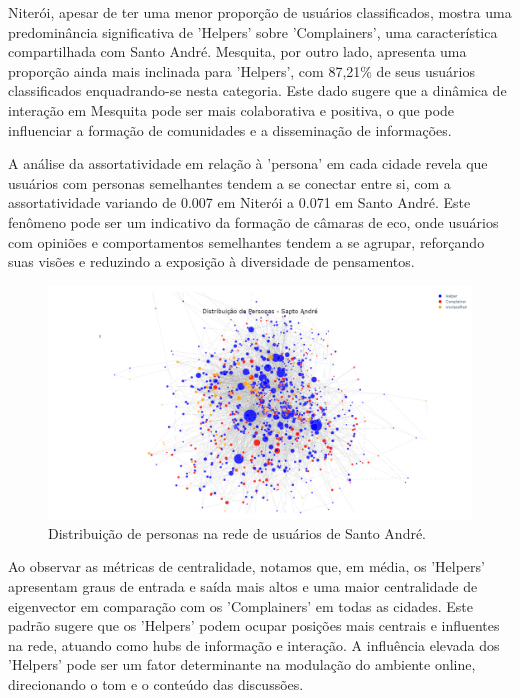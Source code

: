 Niterói, apesar de ter uma menor proporção de usuários classificados, mostra uma predominância significativa de 'Helpers' sobre 'Complainers', uma característica compartilhada com Santo André. Mesquita, por outro lado, apresenta uma proporção ainda mais inclinada para 'Helpers', com 87,21\% de seus usuários classificados enquadrando-se nesta categoria. Este dado sugere que a dinâmica de interação em Mesquita pode ser mais colaborativa e positiva, o que pode influenciar a formação de comunidades e a disseminação de informações.

A análise da assortatividade em relação à 'persona' em cada cidade revela que usuários com personas semelhantes tendem a se conectar entre si, com a assortatividade variando de 0.007 em Niterói a 0.071 em Santo André. Este fenômeno pode ser um indicativo da formação de câmaras de eco, onde usuários com opiniões e comportamentos semelhantes tendem a se agrupar, reforçando suas visões e reduzindo a exposição à diversidade de pensamentos.

\begin{figure}[h]
    \centering
    \includegraphics[width=1\textwidth]{images/network_personas_sandre.png}
    \caption{Distribuição de personas na rede de usuários de Santo André.}
    \label{fig:network_personas_sandre}
\end{figure}

Ao observar as métricas de centralidade, notamos que, em média, os 'Helpers' apresentam graus de entrada e saída mais altos e uma maior centralidade de eigenvector em comparação com os 'Complainers' em todas as cidades. Este padrão sugere que os 'Helpers' podem ocupar posições mais centrais e influentes na rede, atuando como hubs de informação e interação. A influência elevada dos 'Helpers' pode ser um fator determinante na modulação do ambiente online, direcionando o tom e o conteúdo das discussões.

